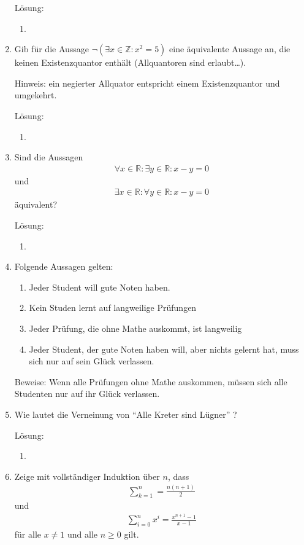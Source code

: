 \documentclass[../main.tex]{subfiles}
\begin{document}
\begin{enumerate}
	      Lösung:
	      \begin{enumerate}
		      \item
	      \end{enumerate}
	\item Gib für die Aussage \(
	      \neg (\exists x \in \mathbb{Z} : x^2 = 5)
	      \) eine äquivalente Aussage an, die keinen Existenzquantor enthält
	      (Allquantoren sind erlaubt\dots ).

	      Hinweis: ein negierter Allquator entspricht einem Existenzquantor und umgekehrt.

	      Lösung:
	      \begin{enumerate}
		      \item
	      \end{enumerate}
	\item Sind die Aussagen
	      \begin{align*}
		      \forall x \in \mathbb{R} : \exists y \in \mathbb{R} : x - y = 0
	      \end{align*} und
	      \begin{align*}
		      \exists x \in \mathbb{R} : \forall y \in \mathbb{R} : x - y = 0
	      \end{align*}
	      äquivalent?

	      Lösung:
	      \begin{enumerate}
		      \item
	      \end{enumerate}
	\item Folgende Aussagen gelten:
	      \begin{enumerate}
		      \item Jeder Student will gute Noten haben.
		      \item Kein Studen lernt auf langweilige Prüfungen
		      \item Jeder Prüfung, die ohne Mathe auskommt, ist langweilig
		      \item Jeder Student, der gute Noten haben will, aber nichts gelernt hat,
		            muss sich nur auf sein Glück verlassen.
	      \end{enumerate}
	      Beweise: Wenn alle Prüfungen ohne Mathe auskommen, müssen sich alle Studenten nur auf ihr Glück verlassen.
	\item Wie lautet die Verneinung von "`Alle Kreter sind Lügner"' ?

	      Lösung:
	      \begin{enumerate}
		      \item
	      \end{enumerate}
	\item Zeige mit vollständiger Induktion über \(
	      n
	      \), dass
	      \begin{align*}
		      \sum_{k = 1}^{n} = \frac{n(n + 1)}{2}
	      \end{align*}
	      und
	      \begin{align*}
	      \sum_{i = 0}^{n} x^i = \frac{x^{n + 1} - 1}{
		      x - 1
	      }
	      \end{align*} für alle \(
	      x \neq 1
	      \) und alle \(
	      n \geq 0
	      \) gilt.


\end{enumerate}
\end{document}
